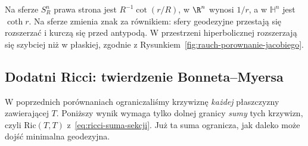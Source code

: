 Na sferze $S_R^n$ prawa strona jest
$R^{-1}\cot(r/R)$, w $\R^n$ wynosi $1/r$,
a w $\mathbb H^n$ jest $\coth r$.
Na sferze zmienia znak za równikiem:
sfery geodezyjne przestają się rozszerzać
i kurczą się przed antypodą. W przestrzeni
hiperbolicznej rozszerzają się szybciej niż
w płaskiej, zgodnie z Rysunkiem~\ref{fig:rauch-porownanie-jacobiego}.

\subsection*{Dodatni Ricci: twierdzenie Bonneta--Myersa}

W poprzednich porównaniach ograniczaliśmy
krzywiznę \emph{każdej} płaszczyzny zawierającej
$T$. Poniższy wynik wymaga tylko dolnej granicy
\emph{sumy} tych krzywizn, czyli $\mathrm{Ric}(T,T)$
z~\eqref{eq:ricci-suma-sekcji}. Już ta suma
ogranicza, jak daleko może dojść minimalna
geodezyjna.

